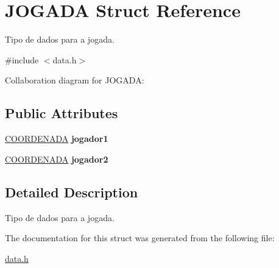 \hypertarget{structJOGADA}{}\section{J\+O\+G\+A\+DA Struct Reference}
\label{structJOGADA}


Tipo de dados para a jogada.  




{\ttfamily \#include $<$data.\+h$>$}



Collaboration diagram for J\+O\+G\+A\+DA\+:
\subsection*{Public Attributes}
\begin{DoxyCompactItemize}
\item 
\mbox{\label{structJOGADA_a93d9306cb0c49b66b7d9a615bffe0149}} 
\hyperlink{structCOORDENADA}{C\+O\+O\+R\+D\+E\+N\+A\+DA} {\bfseries jogador1}
\item 
\mbox{\label{structJOGADA_ab46b16dfbdc7f2af9430c8dcdac0914b}} 
\hyperlink{structCOORDENADA}{C\+O\+O\+R\+D\+E\+N\+A\+DA} {\bfseries jogador2}
\end{DoxyCompactItemize}


\subsection{Detailed Description}
Tipo de dados para a jogada. 

The documentation for this struct was generated from the following file\+:\begin{DoxyCompactItemize}
\item 
\hyperlink{data_8h}{data.\+h}\end{DoxyCompactItemize}
